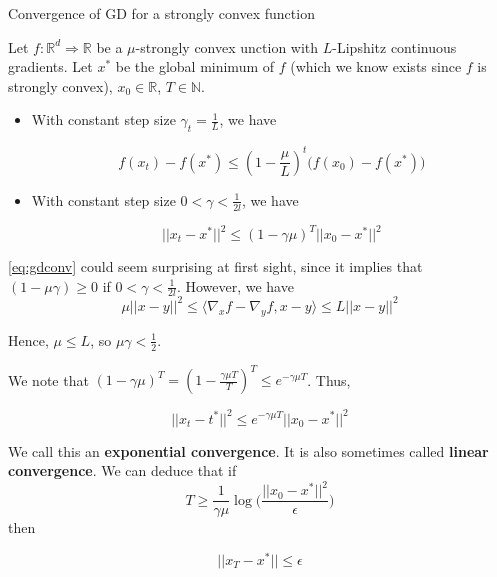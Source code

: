 \documentclass[
10pt, %
a4paper, %
oneside, %
headinclude,footinclude, %
BCOR5mm, %
]{scrartcl}
\begin{document}
\begin{theorem}{Convergence of GD for a strongly convex function}

    Let $f: \mathbb{R}^d\Rightarrow \mathbb{R}	$ be a  $\mu$-strongly convex unction with $L$-Lipshitz continuous gradients. Let $x^*$ be the global minimum of $f$ (which we know exists since $f$ is strongly convex), $x_0\in \mathbb{R} $, $T\in \mathbb{N}$.

    \begin{itemize}
	\item With constant step size $\gamma_t = \frac{1}{L} $, we have

	    \begin{equation*}
		f(x_t)-f(x^*)\leq ( 1- \frac{\mu}{L})^t\big(f(x_0)-f(x^*)\big) 
	    \end{equation*}
        \item With constant step size $0<\gamma < \frac{1}{2l} $, we have

    \begin{equation}
	\label{eq:gdconv}
	||x_t-x^*||^2\leq (1-\gamma \mu)^T ||x_0-x^*||^2
    \end{equation}
    \end{itemize}
\end{theorem}

\begin{remark}
    \ref{eq:gdconv} could seem surprising at first sight, since it implies that $ (1-\mu\gamma)\geq 0$ if $0<\gamma< \frac{1}{2l}$. However, we have
\begin{equation*}
    \mu ||x-y||^2\leq \langle \nabla_xf-\nabla_yf, x-y \rangle \leq L||x-y||^2
\end{equation*}

Hence, $\mu\leq L$, so $\mu\gamma < \frac{1}{2} $.
\end{remark}

\begin{corollary}
    We note that $ (1-\gamma \mu)^T = (1- \frac{ \gamma \mu T}{T} )^T\leq e^{-\gamma \mu T}$. Thus,

    \begin{equation*}
	||x_t-t^*||^2\leq e^{-\gamma\mu T}||x_0-x^*||^2
    \end{equation*}

    We call this an \textbf{{exponential convergence}}. It is also sometimes called \textbf{{linear convergence}}. We can deduce that if 
    \begin{equation*}
	T \geq \frac{1}{ \gamma \mu} \log \big( \frac{||x_0-x^*||^2}{\epsilon}  \big)
    \end{equation*}
    then

    \begin{equation*}
        ||x_T-x^*||\leq \epsilon
    \end{equation*}
\end{corollary}
\end{document}
